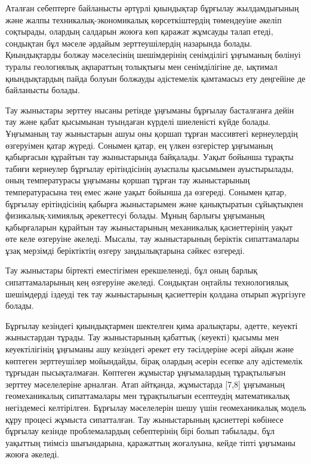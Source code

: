 \begin{multicols}{2}
Аталған себептерге байланысты әртүрлі қиындықтар бұрғылау жылдамдығының
және жалпы техникалық-экономикалық көрсеткіштердің төмендеуіне әкеліп
соқтырады, олардың салдарын жоюға көп қаражат жұмсауды талап етеді,
сондықтан бұл мәселе әрдайым зерттеушілердің назарында болады.
Қиындықтарды болжау мәселесінің шешімдерінің сенімділігі ұңғыманың
бөлінуі туралы геологиялық ақпараттың толықтығы мен сенімділігіне де,
ықтимал қиындықтардың пайда болуын болжауды әдістемелік қамтамасыз ету
деңгейіне де байланысты болады.

Тау жыныстары зерттеу нысаны ретінде ұңғыманы бұрғылау басталғанға дейін
тау және қабат қысымынан туындаған күрделі шиеленісті күйде болады.
Ұңғыманың тау жыныстарын ашуы оны қоршап тұрған массивтегі кернеулердің
өзгеруімен қатар жүреді. Сонымен қатар, ең үлкен өзгерістер ұңғыманың
қабырғасын құрайтын тау жыныстарында байқалады. Уақыт бойынша тұрақты
табиғи кернеулер бұрғылау ерітіндісінің ауыспалы қысымымен ауыстырылады,
оның температурасы ұңғыманы қоршап тұрған тау жыныстарының
температурасына тең емес және уақыт бойынша да өзгереді. Сонымен қатар,
бұрғылау ерітіндісінің қабырға жыныстарымен және қанықтыратын
сұйықтықпен физикалық-химиялық әрекеттесуі болады. Мұның барлығы
ұңғыманың қабырғаларын құрайтын тау жыныстарының механикалық
қасиеттерінің уақыт өте келе өзгеруіне әкеледі. Мысалы, тау жыныстарының
беріктік сипаттамалары ұзақ мерзімді беріктіктің өзгеру заңдылықтарына
сәйкес өзгереді.

Тау жыныстары біртекті еместігімен ерекшеленеді, бұл оның барлық
сипаттамаларының кең өзгеруіне әкеледі. Сондықтан оңтайлы технологиялық
шешімдерді іздеуді тек тау жыныстарының қасиеттерін қолдана отырып
жүргізуге болады.

Бұрғылау кезіндегі қиындықтармен шектелген қима аралықтары, әдетте,
кеуекті жыныстардан тұрады. Тау жыныстарының қабаттық (кеуекті) қысымы
мен кеуектілігінің ұңғыманы ашу кезіндегі әрекет ету тәсілдеріне әсері
айқын және көптеген зерттеушілер мойындайды, бірақ олардың әсерін есепке
алу әдістемелік тұрғыдан пысықталмаған. Көптеген жұмыстар ұңғымалардың
тұрақтылығын зерттеу мәселелеріне арналған. Атап айтқанда, жұмыстарда
{[}7,8{]} ұңғыманың геомеханикалық сипаттамалары мен тұрақтылығын
есептеудің математикалық негіздемесі келтірілген. Бұрғылау мәселелерін
шешу үшін геомеханикалық модель құру процесі жұмыста сипатталған. Тау
жыныстарының қасиеттері көбінесе бұрғылау кезінде проблемалардың
себептерінің бірі болып табылады, бұл уақыттың тиімсіз шығындарына,
қаражаттың жоғалуына, кейде тіпті ұңғыманы жоюға әкеледі.


\end{multicols}
